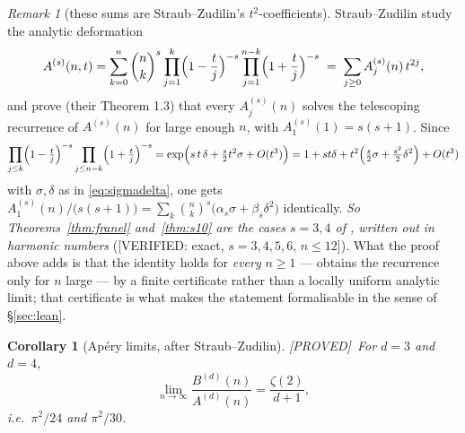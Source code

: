 \documentclass[11pt,reqno]{amsart}
\theoremstyle{plain}
\newtheorem{corollary}[theorem]{Corollary}
\theoremstyle{definition}
\theoremstyle{remark}
\newtheorem{remark}[theorem]{Remark}
\newcommand{\bin}[2]{\binom{#1}{#2}}
\newcommand{\Proved}{\textup{\textsf{[PROVED]}}}
\newcommand{\VerifiedR}[1]{\textup{\textsf{[VERIFIED: #1]}}}
\numberwithin{equation}{section}
\begin{document}
\begin{remark}[these sums are Straub--Zudilin's $t^2$-coefficients]\label{rem:SZ}
Straub--Zudilin \cite{StraubZudilin} study the analytic deformation
\[
  A^{(s)}(n,t)=\sum_{k=0}^n\bin nk^{s}
    \prod_{j=1}^{k}\Bigl(1-\frac tj\Bigr)^{-s}\prod_{j=1}^{n-k}\Bigl(1+\frac tj\Bigr)^{-s}
  \;=\;\sum_{j\ge0}A^{(s)}_j(n)\,t^{2j},
\]
and prove (their Theorem 1.3) that every $A^{(s)}_j(n)$ solves the telescoping recurrence of
$A^{(s)}(n)$ for large enough $n$, with $A^{(s)}_1(1)=s(s+1)$. Since
\[
  \prod_{j\le k}\Bigl(1-\tfrac tj\Bigr)^{-s}\prod_{j\le n-k}\Bigl(1+\tfrac tj\Bigr)^{-s}
  =\exp\Bigl(s\,t\,\delta+\tfrac{s}{2}t^{2}\sigma+O(t^{3})\Bigr)
  =1+st\delta+t^{2}\Bigl(\tfrac s2\sigma+\tfrac{s^{2}}2\delta^{2}\Bigr)+O(t^{3})
\]
with $\sigma,\delta$ as in \eqref{eq:sigmadelta}, one gets
$A^{(s)}_1(n)/\bigl(s(s+1)\bigr)=\sum_k\bin nk^{s}\bigl(\alpha_s\sigma+\beta_s\delta^2\bigr)$
identically. \emph{So Theorems~\ref{thm:franel} and~\ref{thm:s10} are the cases $s=3,4$ of
\cite[Thm.~1.3]{StraubZudilin}, written out in harmonic numbers}
(\VerifiedR{exact, $s=3,4,5,6$, $n\le12$}). What the proof above adds is that the identity
holds for \emph{every} $n\ge1$ --- \cite{StraubZudilin} obtains the recurrence only for $n$
large --- by a finite certificate rather than a locally uniform analytic limit; that
certificate is what makes the statement formalisable in the sense of \S\ref{sec:lean}.
\end{remark}

\begin{corollary}[Ap\'ery limits, after Straub--Zudilin]\label{cor:limits}
\Proved\ For $d=3$ and $d=4$,
\[
  \lim_{n\to\infty}\frac{B^{(d)}(n)}{A^{(d)}(n)}=\frac{\zeta(2)}{d+1},
\]
i.e.\ $\pi^2/24$ and $\pi^2/30$.
\end{corollary}
\end{document}
